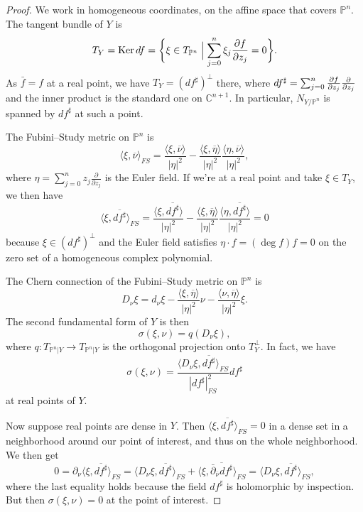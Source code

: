 \documentclass[11pt]{article}
\theoremstyle{definition}
\newcommand{\kk}[1]{\mathbb{#1}}
\def\ov#1{\overline{#1}}
\DeclareMathOperator{\Ker}{Ker}
\begin{document}
\begin{proof}
We work in homogeneous coordinates, on the affine space that covers $\kk P^{n}$.
The tangent bundle of $Y$ is
\[
  T_{Y} = \Ker df
  = \biggl\{
  \xi \in T_{\kk P^{n}}
  \Bigm| \sum_{j=0}^{n} \xi_{j} \frac{\partial f}{\partial z_{j}} = 0
  \biggr\}.
\]
As $\bar f = f$ at a real point, we have $T_{Y} = (df^{\sharp})^{\perp}$ there,
where $df^{\sharp} =
\smash{\sum_{j=0}^{n} \frac{\partial f}{\partial z_{j}} \frac{\partial}{\partial z_{j}}}$ and the inner product is the standard one on $\kk C^{n+1}$.
In particular, $N_{Y/\kk P^{n}}$ is spanned by $df^{\sharp}$ at such a point.

The Fubini--Study metric on $\kk P^{n}$ is
\[
  \langle \xi, \ov\nu \rangle_{FS}
  = \frac{\langle \xi, \ov\nu \rangle}{|\eta|^{2}}
  - \frac{\langle \xi, \ov\eta \rangle}{|\eta|^{2}}
  \frac{\langle \eta, \ov\nu \rangle}{|\eta|^{2}},
\]
where $\eta = \sum_{j=0}^{n} z_{j} \frac{\partial}{\partial z_{j}}$ is the Euler field.
If we're at a real point and take $\xi \in T_{Y}$, we then have
\[
  \langle \xi, \ov{df^{\sharp}} \rangle_{FS}
  = \frac{\langle \xi, \ov{df^{\sharp}} \rangle}{|\eta|^{2}}
  - \frac{\langle \xi, \ov\eta \rangle}{|\eta|^{2}}
  \frac{\langle \eta, \ov{df^{\sharp}} \rangle}{|\eta|^{2}}
  = 0
\]
because $\xi \in (df^{\sharp})^{\perp}$ and the Euler field satisfies $\eta \cdot f = (\deg f) f = 0$ on the zero set of a homogeneous complex polynomial.

The Chern connection of the Fubini--Study metric on $\kk P^{n}$ is
\[
  D_{\nu} \xi = d_{\nu}\xi
  - \frac{\langle \xi, \ov\eta\rangle}{|\eta|^{2}} \nu
  - \frac{\langle \nu, \ov\eta\rangle}{|\eta|^{2}} \xi.
\]
The second fundamental form of $Y$ is then
\[
  \sigma(\xi, \nu)
  = q(D_{\nu}\xi),
\]
where $q : T_{\kk P^{n}|Y} \to T_{\kk P^{n}|Y}$ is the orthogonal projection onto $T_{Y}^{\perp}$.
In fact, we have
\[
  \sigma(\xi, \nu)
  = \frac{\langle D_{\nu} \xi, \ov{df^{\sharp}} \rangle_{FS}}{|df^{\sharp}|_{FS}^{2}} df^{\sharp}
\]
at real points of $Y$.

Now suppose real points are dense in $Y$.
Then $\langle \xi, \ov{df^{\sharp}} \rangle_{FS} = 0$ in a dense set in a neighborhood around our point of interest, and thus on the whole neighborhood.
We then get
\[
  0 = \partial_{\nu} \langle \xi, \ov{df^{\sharp}} \rangle_{FS}
  = \langle D_{\nu}\xi,  \ov{df^{\sharp}} \rangle_{FS}
  + \langle \xi,  \ov{\bar\partial_{\ov\nu}df^{\sharp}} \rangle_{FS}
  = \langle D_{\nu}\xi,  \ov{df^{\sharp}} \rangle_{FS},
\]
where the last equality holds because the field $df^{\sharp}$ is holomorphic by inspection.
But then $\sigma(\xi, \nu) = 0$ at the point of interest.
\end{proof}
\end{document}
